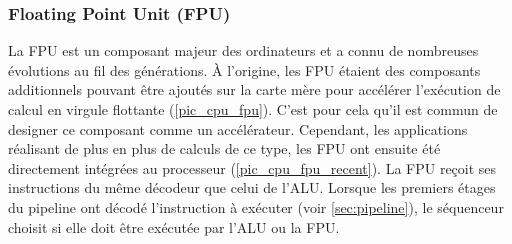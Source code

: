     
    \subsubsection{Floating Point Unit (FPU)}
        La \gls{FPU} est un composant majeur des ordinateurs et a connu de nombreuses évolutions au fil des générations. À l'origine, les FPU étaient des composants additionnels pouvant être ajoutés sur la carte mère pour accélérer l'exécution de calcul en virgule flottante (\autoref{pic_cpu_fpu}). C'est pour cela qu'il est commun de designer ce composant comme un accélérateur. Cependant, les applications réalisant de plus en plus de calculs de ce type, les FPU ont ensuite été directement intégrées au processeur (\autoref{pic_cpu_fpu_recent}). La FPU reçoit ses instructions du même décodeur que celui de l'\gls{ALU}. Lorsque les premiers étages du pipeline ont décodé l'instruction à exécuter (voir \autoref{sec:pipeline}), le séquenceur choisit si elle doit être exécutée par l'\gls{ALU} ou la \gls{FPU}. 
        
